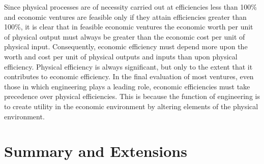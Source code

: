 Since physical processes are of necessity carried out at efficiencies less than 100\% and economic ventures are feasible only if they attain efficiencies greater than 100\%, it is clear that in feasible economic ventures the economic worth per unit of physical output must always be greater than the economic cost per unit of physical input. Consequently, economic efficiency must depend more upon the worth and cost per unit of physical outputs and inputs than upon physical efficiency. Physical efficiency is always significant, but only to the extent that it contributes to economic efficiency.
In the final evaluation of most ventures, even those in which engineering plays a leading role, economic efficiencies must take precedence over physical efficiencies. This is because the function of engineering is to create utility in the economic environment by altering elements of the physical environment.


\section{Summary and Extensions}


